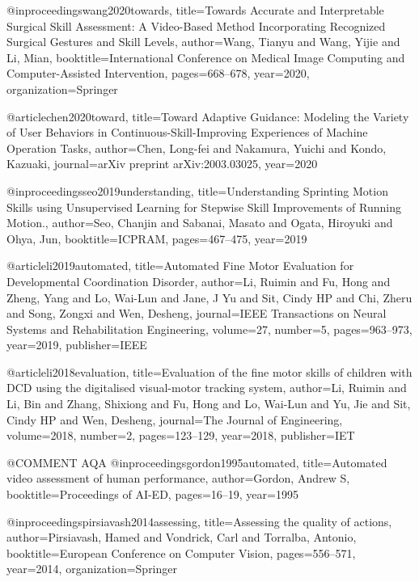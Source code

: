 @inproceedings{wang2020towards,
  title={Towards Accurate and Interpretable Surgical Skill Assessment: A Video-Based Method Incorporating Recognized Surgical Gestures and Skill Levels},
  author={Wang, Tianyu and Wang, Yijie and Li, Mian},
  booktitle={International Conference on Medical Image Computing and Computer-Assisted Intervention},
  pages={668--678},
  year={2020},
  organization={Springer}
}

@article{chen2020toward,
  title={Toward Adaptive Guidance: Modeling the Variety of User Behaviors in Continuous-Skill-Improving Experiences of Machine Operation Tasks},
  author={Chen, Long-fei and Nakamura, Yuichi and Kondo, Kazuaki},
  journal={arXiv preprint arXiv:2003.03025},
  year={2020}
}

@inproceedings{seo2019understanding,
  title={Understanding Sprinting Motion Skills using Unsupervised Learning for Stepwise Skill Improvements of Running Motion.},
  author={Seo, Chanjin and Sabanai, Masato and Ogata, Hiroyuki and Ohya, Jun},
  booktitle={ICPRAM},
  pages={467--475},
  year={2019}
}

@article{li2019automated,
  title={Automated Fine Motor Evaluation for Developmental Coordination Disorder},
  author={Li, Ruimin and Fu, Hong and Zheng, Yang and Lo, Wai-Lun and Jane, J Yu and Sit, Cindy HP and Chi, Zheru and Song, Zongxi and Wen, Desheng},
  journal={IEEE Transactions on Neural Systems and Rehabilitation Engineering},
  volume={27},
  number={5},
  pages={963--973},
  year={2019},
  publisher={IEEE}
}

@article{li2018evaluation,
  title={Evaluation of the fine motor skills of children with DCD using the digitalised visual-motor tracking system},
  author={Li, Ruimin and Li, Bin and Zhang, Shixiong and Fu, Hong and Lo, Wai-Lun and Yu, Jie and Sit, Cindy HP and Wen, Desheng},
  journal={The Journal of Engineering},
  volume={2018},
  number={2},
  pages={123--129},
  year={2018},
  publisher={IET}
}






@COMMENT AQA
@inproceedings{gordon1995automated,
  title={Automated video assessment of human performance},
  author={Gordon, Andrew S},
  booktitle={Proceedings of AI-ED},
  pages={16--19},
  year={1995}
}

@inproceedings{pirsiavash2014assessing,
  title={Assessing the quality of actions},
  author={Pirsiavash, Hamed and Vondrick, Carl and Torralba, Antonio},
  booktitle={European Conference on Computer Vision},
  pages={556--571},
  year={2014},
  organization={Springer}
}

